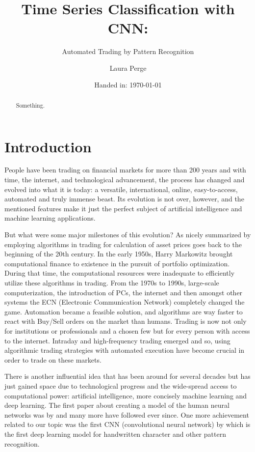\documentclass[11pt, a4paper]{article}
\author{Laura Perge}
\title{Time Series Classification with CNN:}
\subtitle{ Automated Trading by Pattern Recognition}
\date{Handed in: \today}
\begin{document}
\maketitle

\tableofcontents

\begin{abstract}
    Something.
\end{abstract}

\section{Introduction}
People have been trading on financial markets for more than 200 years and with time, the internet, and technological advancement, the process has changed and evolved into what it is today:  
a versatile, international, online, easy-to-access, automated and truly immense beast. Its evolution is not over, however, and the mentioned features make it just the perfect subject of 
artificial intelligence and machine learning applications. 

But what were some major milestones of this evolution? As nicely summarized by \cite{rialtohistory}  employing algorithms in trading for calculation of asset prices goes back to the beginning of 
the 20th century. In the early 1950s, Harry Markowitz brought computational finance to existence in the pursuit of portfolio optimization. During that time, the computational 
resources were inadequate to efficiently utilize these algorithms in trading. From the 1970s to 1990s, 
large-scale computerization, the introduction of PCs, the internet and then amongst other systems the ECN (Electronic Communication Network) completely changed the game. Automation became a 
feasible solution, and algorithms are way faster to react with Buy/Sell orders on the market than humans. Trading is now not only for institutions or professionals and a chosen few but for 
every person with access to the internet. Intraday and high-frequency trading emerged and so, using algorithmic trading strategies with automated execution have become crucial in order to 
trade on these markets. 

There is another influential idea that has been around for several decades but has just gained space due to technological progress and the wide-spread access to computational power: artificial intelligence, more 
concisely machine learning and deep learning. 
The first paper about creating a model of the human neural networks was by \cite{mcculloch1943logical} and many more have followed ever since. 
One more achievement related to our topic was the first CNN (convolutional neural network) by \cite{fukushima1979neural} which is the first deep learning model for handwritten character and other 
pattern recognition.
\end{document}

